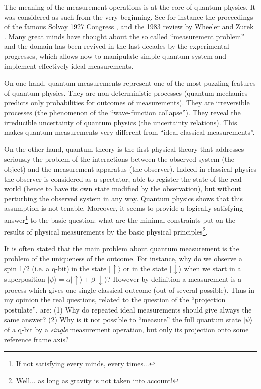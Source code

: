 The meaning of the measurement operations is at the core of quantum physics. It was considered as such from the very beginning.
See for instance the proceedings of the famous Solvay 1927 Congress \cite{Solvay27}, and the 1983 review by Wheeler and Zurek \cite{WheelerZurek83}. Many great minds have thought about the so called ``measurement problem''  and the domain has been revived in the last decades by the experimental progresses, which allows now to manipulate simple quantum system and implement effectively ideal measurements.

On one hand, quantum measurements represent one of the most puzzling features of quantum physics. They are non-deterministic processes (quantum mechanics predicts only probabilities for outcomes of measurements). They are irreversible processes (the phenomenon of the ``wave-function collapse''). They reveal the irreducible uncertainty of quantum physics (the uncertainty relations).
This makes quantum measurements very different from ``ideal classical measurements''. 

On the other hand, quantum theory is the first physical theory that addresses seriously the problem of the interactions between the observed system (the object) and the measurement apparatus (the observer).
Indeed in classical physics the observer is considered as a spectator, able to register the state of the real world (hence to have its own state modified by the observation), but without perturbing the observed system in any way. 
Quantum physics shows that this assumption is not tenable. 
Moreover, it seems to provide a logically satisfying answer\footnote{If not satisfying every minds, every  times...} to the basic question: what are the minimal constraints put on the results of physical measurements by the basic physical principles\footnote{Well...  as long as gravity is not taken into account!}.

It is often stated that the main problem about quantum measurement is the problem of the uniqueness of the outcome. 
For instance, why do we observe a spin 1/2 (i.e. a q-bit) in the state $|{\uparrow}\rangle$ or in the state $|{\downarrow}\rangle$ when we start in a superposition $|\psi\rangle=\alpha|{\uparrow}\rangle+\beta |{\downarrow}\rangle$? However by definition a measurement is a process which gives one single classical outcome (out of several possible).
Thus in my opinion the real questions, related to the question of the ``projection postulate'', are: (1) Why do repeated ideal measurements should give always the same answer? 
(2) Why is it not  possible to ``measure'' the full quantum state $|\psi\rangle$ of a q-bit by a \emph{single} measurement operation, but only its projection onto some reference frame axis?


